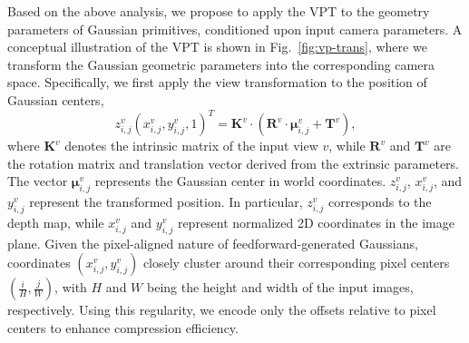 \documentclass[lettersize,journal]{IEEEtran}
\begin{document}
Based on the above analysis, we propose to apply the VPT to the geometry parameters of Gaussian primitives, conditioned upon input camera parameters.
A conceptual illustration of the VPT is shown in Fig.~\ref{fig:vp-trans}, where we transform the Gaussian geometric parameters into the corresponding camera space.
Specifically, we first apply the view transformation to the position of Gaussian centers,
\begin{equation}
    z_{i,j}^v(x_{i,j}^v,y_{i,j}^v,1)^T = \boldsymbol{K}^v\cdot(\boldsymbol{R}^v\cdot \boldsymbol{\mu}_{i,j}^v + \boldsymbol{T}^v),
\end{equation}
where $\boldsymbol{K}^v$ denotes the intrinsic matrix of the input view $v$, while $\boldsymbol{R}^v$ and $\boldsymbol{T}^v$ are the rotation matrix and translation vector derived from the extrinsic parameters.
The vector $\boldsymbol{\mu}_{i,j}^v$ represents the Gaussian center in world coordinates. $z_{i,j}^v$, $x_{i,j}^v$, and $y_{i,j}^v$ represent the transformed position. In particular, $z_{i,j}^v$ corresponds to the depth map, while $x_{i,j}^v$ and $y_{i,j}^v$ represent normalized 2D coordinates in the image plane.
Given the pixel-aligned nature of feedforward-generated Gaussians, coordinates $(x_{i,j}^{v}, y_{i,j}^{v})$ closely cluster around their corresponding pixel centers $(\frac{i}{H}, \frac{j}{W})$, with $H$ and $W$ being the height and width of the input images, respectively. Using this regularity, we encode only the offsets relative to pixel centers to enhance compression efficiency.
\end{document}
